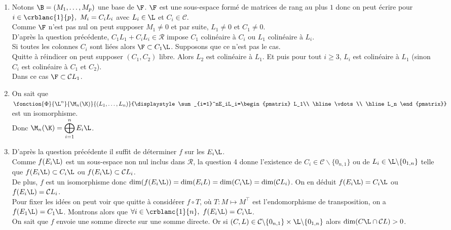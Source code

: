 \documentclass[8pt]{book}
\begin{document}
\begin{enumerate}[leftmargin=*]
		$$A^{-1}(C_1L_1+C_2L_2)B^{-1}=E_{11}+E_{22}$$
		qui est de rang $2$.
		\item Notons $\B=(M_1,\dots,M_p)$ une base de $\F$. $\F$ est une sous-espace formé de matrices de rang au plus $1$ donc on peut écrire pour $i\in \crblanc{1}{p},\ M_i=C_iL_i$ avec $L_i\in \L$ et $C_i\in \mathcal C$.\\
		Comme $\F$ n'est pas nul on peut supposer $M_1\ne 0$ et par suite, $L_1\ne 0$ et $C_1\ne 0$.\\
		D'après la question précédente, $C_1L_1+C_iL_i\in \mathcal R$ impose $C_1$ colinéaire à $C_i$ ou $L_1$ colinéaire à $L_i$.\\
		Si toutes les colonnes $C_i$ sont liées alors $\F\subset C_1\L$. Supposons que ce n'est pas le cas.\\
		Quitte à réindicer on peut supposer $(C_1,C_2)$ libre. Alors $L_2$ est colinéaire à $L_1$. Et puis pour tout $i\geq 3$, $L_i$ est colinéaire à $L_1$ (sinon $C_i$ est colinéaire à $C_1$ et $C_2$).\\
		Dans ce cas $\F\subset \mathcal CL_1$.
		\item On sait que $\fonction{\Phi}{\L^n}{\M_n(\K)}{(L_1,\dots,L_n)}{\displaystyle\sum_{i=1}^nE_iL_i=\begin{pmatrix}
				L_1\\
				\hline
				\vdots\\
				\hline
				L_n
		\end{pmatrix}}$ est un isomorphisme.\\
		Donc $\M_n(\K)=\displaystyle\bigoplus_{i=1}^nE_i\L$.
		\item D'après la question précédente il suffit de déterminer $f$ sur les $E_i\L$.\\
		Comme $f(E_i\L)$ est un sous-espace non nul inclus dans $\mathcal R$, la question 4 donne l'existence de $C_i\in \mathcal C\backslash\{0_{n,1}\}$ ou de $L_i\in \L\backslash\{0_{1,n}\}$ telle que $f(E_i\L)\subset C_i\L$ ou $f(E_i\L)\subset \mathcal CL_i$.\\
		De plus, $f$ est un isomorphisme donc $\dim(f(E_i\L))=\dim(E_iL)=\dim(C_i\L)=\dim(\mathcal CL_i)$. On en déduit $f(E_i\L)=C_i\L$ ou $f(E_i\L)=\mathcal CL_i$.\\
		Pour fixer les idées on peut voir que quitte à considérer $f\circ T$, où $T:M\mapsto M^\top$ est l'endomorphisme de transposition, on a $f(E_1\L)=C_1\L$. Montrons alors que $\forall i\in \crblanc{1}{n},\ f(E_i\L)=C_i\L$.\\
		On sait que $f$ envoie une somme directe sur une somme directe. Or si $(C,L)\in \mathcal C\backslash\{0_{n,1}\}\times\L\backslash\{0_{1,n}\}$ alors $\dim(C\L\cap\mathcal CL)>0$.\\

\end{enumerate}
\end{document}
